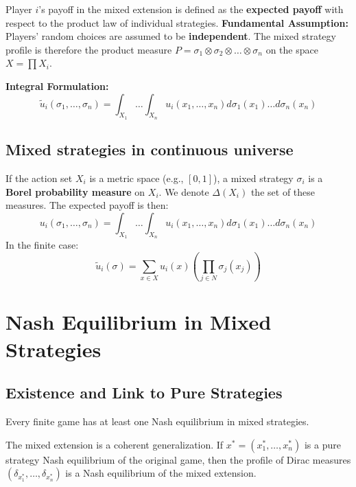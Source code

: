 \begin{definition}
Player $i$'s payoff in the mixed extension is defined as the \textbf{expected payoff} with respect to the product law of individual strategies.
\textbf{Fundamental Assumption:} Players' random choices are assumed to be \textbf{independent}. The mixed strategy profile is therefore the product measure $P = \sigma_1 \otimes \sigma_2 \otimes \dots \otimes \sigma_n$ on the space $X = \prod X_i$.

\textbf{Integral Formulation:}
$$\tilde{u}_i(\sigma_1, \dots, \sigma_n) = \int_{X_1} \dots \int_{X_n} u_i(x_1, \dots, x_n) d\sigma_1(x_1) \dots d\sigma_n(x_n)$$

\subsection{Mixed strategies in continuous universe}
If the action set $X_i$ is a metric space (e.g., $[0,1]$), a mixed strategy $\sigma_i$ is a \textbf{Borel probability measure} on $X_i$.
We denote $\Delta(X_i)$ the set of these measures. The expected payoff is then:
\[ u_i(\sigma_1, \dots, \sigma_n) = \int_{X_1} \dots \int_{X_n} u_i(x_1, \dots, x_n) d\sigma_1(x_1) \dots d\sigma_n(x_n) \]
In the finite case:
$$\tilde{u}_i(\sigma) = \sum_{x \in X} u_i(x) \left( \prod_{j \in N} \sigma_j(x_j) \right)$$
\end{definition}

\section{Nash Equilibrium in Mixed Strategies}

\subsection{Existence and Link to Pure Strategies}
\begin{theoreme}[Nash, 1950]
Every finite game has at least one Nash equilibrium in mixed strategies.
\end{theoreme}

\begin{proposition}
The mixed extension is a coherent generalization.
If $x^* = (x^*_1, \dots, x^*_n)$ is a pure strategy Nash equilibrium of the original game, then the profile of Dirac measures $(\delta_{x^*_1}, \dots, \delta_{x^*_n})$ is a Nash equilibrium of the mixed extension.
\end{proposition}

